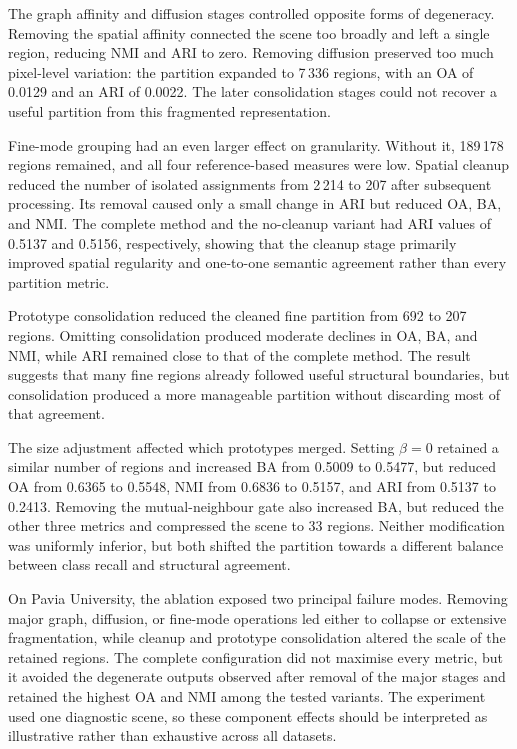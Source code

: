 \documentclass[10pt,a4paper,fleqn]{article}
\begin{document}
The graph affinity and diffusion stages controlled opposite forms of
degeneracy. Removing the spatial affinity connected the scene too broadly and
left a single region, reducing NMI and ARI to zero. Removing diffusion
preserved too much pixel-level variation: the partition expanded to 7\,336
regions, with an OA of 0.0129 and an ARI of 0.0022. The later consolidation
stages could not recover a useful partition from this fragmented
representation.

Fine-mode grouping had an even larger effect on granularity. Without it,
189\,178 regions remained, and all four reference-based measures were low.
Spatial cleanup reduced the number of isolated assignments from 2\,214 to 207
after subsequent processing. Its removal caused only a small change in ARI
but reduced OA, BA, and NMI. The complete method and the no-cleanup variant
had ARI values of 0.5137 and 0.5156, respectively, showing that the cleanup
stage primarily improved spatial regularity and one-to-one semantic agreement
rather than every partition metric.

Prototype consolidation reduced the cleaned fine partition from 692 to 207
regions. Omitting consolidation produced moderate declines in OA, BA, and NMI,
while ARI remained close to that of the complete method. The result suggests
that many fine regions already followed useful structural boundaries, but
consolidation produced a more manageable partition without discarding most of
that agreement.

The size adjustment affected which prototypes merged. Setting \(\beta=0\)
retained a similar number of regions and increased BA from 0.5009 to 0.5477,
but reduced OA from 0.6365 to 0.5548, NMI from 0.6836 to 0.5157, and ARI
from 0.5137 to 0.2413. Removing the mutual-neighbour gate also increased BA,
but reduced the other three metrics and compressed the scene to 33 regions.
Neither modification was uniformly inferior, but both shifted the partition
towards a different balance between class recall and structural agreement.

On Pavia University, the ablation exposed two principal failure modes.
Removing major graph, diffusion, or fine-mode operations led either to collapse
or extensive fragmentation, while cleanup and prototype consolidation altered
the scale of the retained regions. The complete configuration did not maximise
every metric, but it avoided the degenerate outputs observed after removal of
the major stages and retained the highest OA and NMI among the tested
variants. The experiment used one diagnostic scene, so these component effects
should be interpreted as illustrative rather than exhaustive across all
datasets.
\end{document}
